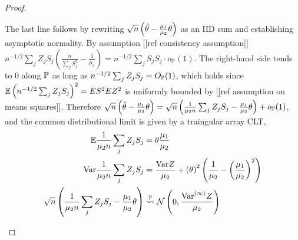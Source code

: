 \documentclass[12pt]{article}
\DeclareMathOperator{\var}{Var}
\newcommand{\z}{Z}
\newcommand{\s}{S}
\let\n\relax
\newcommand{\n}[1]{{#1}^{(n)}}
\newcommand{\iinfty}[1]{{#1}^{(\infty)}}
\newcommand{\EE}{\mathbb{E}}
\newcommand{\PP}{\mathbb{P}}
\newcommand{\E}{E}
\begin{document}
\begin{proof}
\begin{enumerate}[wide, labelwidth=!, labelindent=0pt]
The last line follows by rewriting $\sqrt{n}\left(\hat\theta-\frac{\mu_1}{\mu_2}\n{\theta}\right)$ as an IID sum and establishing asymptotic normality. By assumption [[ref consistency assumption]]  $n^{-1/2}\sum_j\z_j\s_j\left(\frac{n}{\sum_j\s_j^2}-\frac{1}{\mu_2}\right)=n^{-1/2}\sum_j\s_j\s_j\cdot o_{\PP}(1)$. The right-hand side tends to $0$ along $\n{\PP}$ as long as $n^{-1/2}\sum_j\z_j\s_j=O_{\n{\PP}}(1)$, which holds since $\n{\EE}\left(n^{-1/2}\sum_j\z_j\s_j\right)^2=\E\s^2\n{\E}\z^2$ is uniformly bounded by [[ref assumption on means squares]]. Therefore $\sqrt{n}\left(\hat\theta-\frac{\mu_1}{\mu_2}\n{\theta}\right)=\sqrt{n}\left(\frac{1}{\mu_2n}\sum_j\z_j\s_j-\frac{\mu_1}{\mu_2}\n{\theta}\right)+o_{\n{\PP}}(1)$, and the common distributional limit is given by a traingular array CLT,
\begin{align}
   \n{\EE}\frac{1}{\mu_2n}\sum_j\z_j\s_j&=\n{\theta}\frac{\mu_1}{\mu_2}\\
   \n{\var}\frac{1}{\mu_2n}\sum_j\z_j\s_j&=\frac{\n{\var}\z}{\mu_2}+\left(\n{\theta}\right)^2\left(\frac{1}{\mu_2}-\left(\frac{\mu_1}{\mu_2}\right)^2\right)\\
   \sqrt{n}\left(\frac{1}{\mu_2n}\sum_j\z_j\s_j-\frac{\mu_1}{\mu_2}\n{\theta}\right)&\overset{\n{\PP}}{\leadsto}
                                                                                      \mathcal{N}\left(0,\frac{\iinfty{\var}\z}{\mu_2}\right)
\end{align}

\end{enumerate}

\end{proof}




\end{document}

